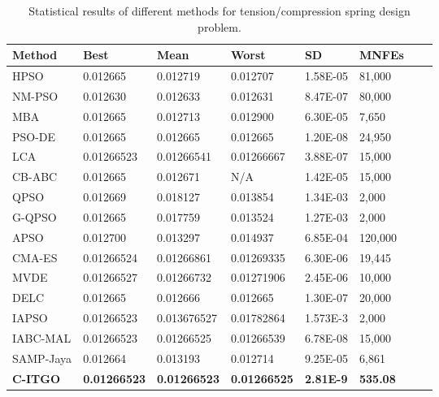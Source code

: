 
\begin{table*}[tp]
    \tiny
\begin{center}

\begin{tabular}{ P{2.0cm} P{2.0cm} P{2.0cm} P{2.0cm} P{2.0cm} P{2.0cm} P{2.0cm} P{2.0cm}  }
\hline
\textbf{Method} & \textbf{Best} & \textbf{Mean} & \textbf{Worst} & \textbf{SD} & \textbf{MNFEs} \\
\hline

HPSO & 0.012665 & 0.012719 & 0.012707 & 1.58E-05 & 81,000 \\
NM-PSO & 0.012630 & 0.012633 & 0.012631 & 8.47E-07 & 80,000 \\
MBA & 0.012665 & 0.012713 & 0.012900 & 6.30E-05 & 7,650 \\
PSO-DE & 0.012665 & 0.012665 & 0.012665 & 1.20E-08 & 24,950 \\
LCA & 0.01266523 & 0.01266541 & 0.01266667 & 3.88E-07 & 15,000 \\
CB-ABC & 0.012665 & 0.012671 & N/A & 1.42E-05 & 15,000 \\
QPSO & 0.012669 & 0.018127 & 0.013854 & 1.34E-03 & 2,000 \\
G-QPSO & 0.012665 & 0.017759 & 0.013524 & 1.27E-03 & 2,000 \\
APSO & 0.012700 & 0.013297 & 0.014937 & 6.85E-04 & 120,000 \\
CMA-ES & 0.01266524 & 0.01266861 & 0.01269335 & 6.30E-06 & 19,445 \\
MVDE & 0.01266527 & 0.01266732 & 0.01271906 & 2.45E-06 & 10,000 \\
DELC & 0.012665 & 0.012666 & 0.012665 & 1.30E-07 & 20,000 \\
IAPSO & 0.01266523 & 0.013676527 & 0.01782864 & 1.573E-3 & 2,000 \\
IABC-MAL & 0.01266523 & 0.01266525 & 0.01266539 & 6.78E-08 & 15,000 \\
SAMP-Jaya & 0.012664 & 0.013193 & 0.012714 & 9.25E-05 & 6,861 \\
\textbf{C-ITGO} & \bf{0.01266523} & \bf{0.01266523} & \bf{0.01266525} & \bf{2.81E-9} & \bf{535.08} \\

\hline
\end{tabular}
\end{center}
\vspace*{-6mm}
\caption{Statistical results of different methods for tension/compression spring design problem. \\[1em]}
\label{tab:TC}
\end{table*}

